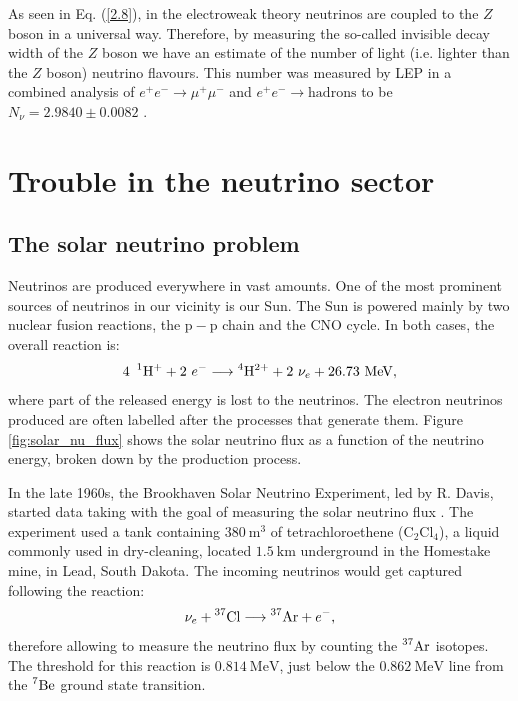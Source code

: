 As seen in Eq. (\ref{2.8}), in the electroweak theory neutrinos are coupled to the $Z$ boson in a universal way. Therefore, by measuring the so-called invisible decay width of the $Z$ boson we have an estimate of the number of light (i.e. lighter than the $Z$ boson) neutrino flavours. This number was measured by LEP in a combined analysis of $e^{+}e^{-} \rightarrow \mu^{+}\mu^{-}$ and $e^{+}e^{-} \rightarrow \mathrm{hadrons}$ to be $N_{\nu} = 2.9840 \pm 0.0082$ \cite{ALEPH2005}.

\section{Trouble in the neutrino sector}

\subsection{The solar neutrino problem}

Neutrinos are produced everywhere in vast amounts. One of the most prominent sources of neutrinos in our vicinity is our Sun. The Sun is powered mainly by two nuclear fusion reactions, the $\mathrm{p}-\mathrm{p}$ chain and the CNO cycle. In both cases, the overall reaction is:
\begin{equation}
	4~\prescript{1}{}{\mathrm{H}}^{+}+2~e^{-} \longrightarrow \prescript{4}{}{\mathrm{H}}^{2+} + 2~\nu_{e} + 26.73~\mathrm{MeV},
\end{equation}
where part of the released energy is lost to the neutrinos. The electron neutrinos produced are often labelled after the processes that generate them. Figure \ref{fig:solar_nu_flux} shows the solar neutrino flux as a function of the neutrino energy, broken down by the production process.

In the late 1960s, the Brookhaven Solar Neutrino Experiment, led by R. Davis, started data taking with the goal of measuring the solar neutrino flux \cite{Davis1968}. The experiment used a tank containing $380~\mathrm{m}^{3}$ of tetrachloroethene ($\mathrm{C}_{2}\mathrm{Cl}_{4}$), a liquid commonly used in dry-cleaning, located $1.5~\mathrm{km}$ underground in the Homestake mine, in Lead, South Dakota. The incoming neutrinos would get captured following the reaction:
\begin{equation}
	\nu_{e} + \prescript{37}{}{\mathrm{Cl}} \longrightarrow \prescript{37}{}{\mathrm{Ar}} + e^{-},
\end{equation}
therefore allowing to measure the neutrino flux by counting the $\prescript{37}{}{\mathrm{Ar}}$ isotopes. The threshold for this reaction is $0.814~\mathrm{MeV}$, just below the $0.862~\mathrm{MeV}$ line from the $\prescript{7}{}{\mathrm{Be}}$ ground state transition.

